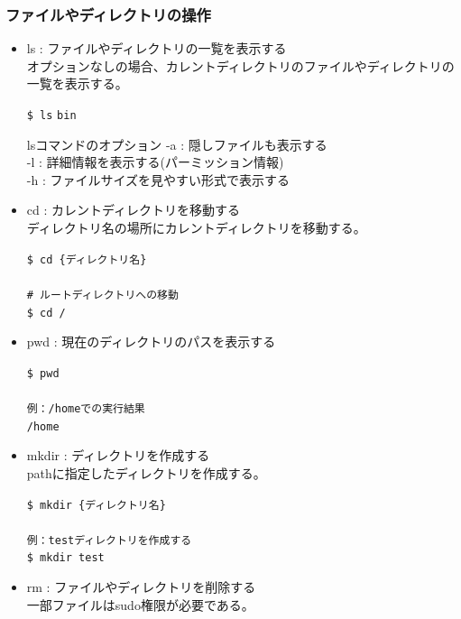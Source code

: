 \documentclass[a4paper, 11pt, dvipdfmx]{jsarticle}
\begin{document}
\subsubsection{ファイルやディレクトリの操作}
\begin{itemize}
  \item ls : ファイルやディレクトリの一覧を表示する\\
  オプションなしの場合、カレントディレクトリのファイルやディレクトリの一覧を表示する。
  \begin{terminalbox}
    \verb|$ ls|
    \verb|bin |
  \end{terminalbox}
  \begin{hosokubox}{lsコマンドのオプション}
    -a : 隠しファイルも表示する\\
    -l : 詳細情報を表示する(パーミッション情報)\\
    -h : ファイルサイズを見やすい形式で表示する
  \end{hosokubox}
  \item cd : カレントディレクトリを移動する\\
  ディレクトリ名の場所にカレントディレクトリを移動する。
  \begin{terminalbox}
    \verb|$ cd {ディレクトリ名}|\\\\
    \verb|# ルートディレクトリへの移動|\\
    \verb|$ cd /|
  \end{terminalbox}
  \item pwd : 現在のディレクトリのパスを表示する
  \begin{terminalbox}
    \verb|$ pwd|\\\\
    \verb|例：/homeでの実行結果|\\
    \verb|/home|
  \end{terminalbox}
  \item mkdir : ディレクトリを作成する\\
  pathに指定したディレクトリを作成する。
  \begin{terminalbox}
    \verb|$ mkdir {ディレクトリ名}|\\\\
    \verb|例：testディレクトリを作成する|\\
    \verb|$ mkdir test|
  \end{terminalbox}
  \item rm : ファイルやディレクトリを削除する\\
  一部ファイルはsudo権限が必要である。
  \begin{terminalbox}

\end{terminalbox}
\end{itemize}
\end{document}
